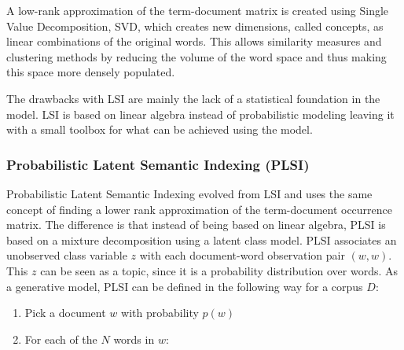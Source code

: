 \documentclass[12pt]{report}
\begin{document}
\vspace{3mm}

A low-rank approximation of the term-document matrix is created using Single Value Decomposition, SVD, which creates new dimensions, called concepts, as linear combinations of the original words. This allows similarity measures and clustering methods by reducing the volume of the word space and thus making this space more densely populated.\par

\vspace{3mm}

The drawbacks with LSI are mainly the lack of a statistical foundation in the model. LSI is based on linear algebra instead of probabilistic modeling leaving it with a small toolbox for what can be achieved using the model.\par
	

\vspace{10mm}
\subsubsection{Probabilistic Latent Semantic Indexing (PLSI)}
\vspace{5mm}

Probabilistic Latent Semantic Indexing evolved from LSI and uses the same concept of finding a lower rank approximation of the term-document occurrence matrix. The difference is that instead of being based on linear algebra, PLSI is based on a mixture decomposition using a latent class model. PLSI associates an unobserved class variable $z$ with each document-word observation pair $(w, w)$. This $z$ can be seen as a topic, since it is a probability distribution over words. As a generative model, PLSI can be defined in the following way for a corpus $D$:

\vspace{3mm}

\begin{enumerate}
\item Pick a document $w$ with probability $p(w)$
\item For each of the $N$ words in $w$:
\end{enumerate}
\end{document}
